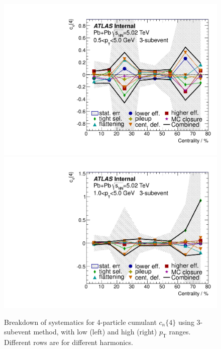 \begin{figure}[H]
\includegraphics[width=.425\linewidth]{figs/sec_sys/summary/sys_c4_3sub_Har4_Pt0.pdf}
\includegraphics[width=.425\linewidth]{figs/sec_sys/summary/sys_c4_3sub_Har4_Pt1.pdf}
\caption{Breakdown of systematics for 4-particle cumulant $c_n\{4\}$ using 3-subevent method, with low (left) and high (right) $p_\text{T}$ ranges. Different rows are for different harmonics.}
\label{fig:apdx_sys_c4_3sub}
\end{figure}

